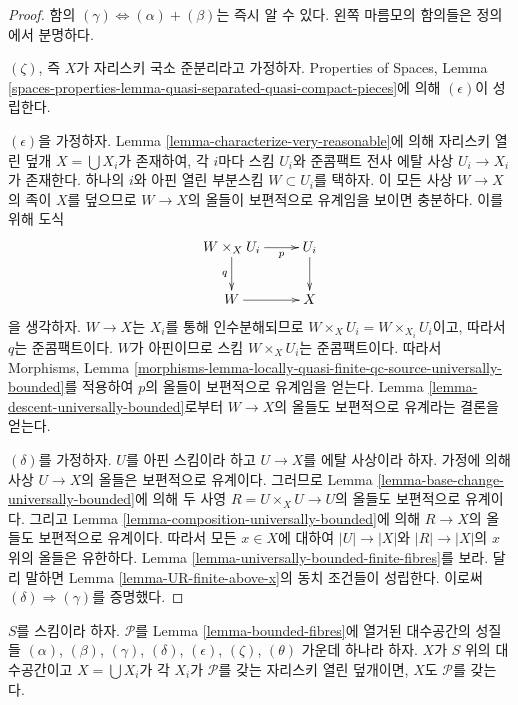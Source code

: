 \begin{proof}
함의 $(\gamma) \Leftrightarrow (\alpha) + (\beta)$는 즉시 알 수 있다.
왼쪽 마름모의 함의들은 정의에서 분명하다.

\medskip\noindent
$(\zeta)$, 즉 $X$가 자리스키 국소 준분리라고 가정하자.
Properties of Spaces, Lemma
\ref{spaces-properties-lemma-quasi-separated-quasi-compact-pieces}에 의해
$(\epsilon)$이 성립한다.

\medskip\noindent
$(\epsilon)$을 가정하자. Lemma
\ref{lemma-characterize-very-reasonable}에 의해 자리스키 열린 덮개
$X = \bigcup X_i$가 존재하여, 각 $i$마다 스킴 $U_i$와 준콤팩트 전사
에탈 사상 $U_i \to X_i$가 존재한다. 하나의 $i$와 아핀 열린 부분스킴
$W \subset U_i$를 택하자. 이 모든 사상 $W \to X$의 족이 $X$를
덮으므로 $W \to X$의 올들이 보편적으로 유계임을 보이면 충분하다.
이를 위해 도식
$$
\xymatrix{
W \times_X U_i \ar[r]_-p \ar[d]_q & U_i \ar[d] \\
W \ar[r] & X
}
$$
을 생각하자. $W \to X$는 $X_i$를 통해 인수분해되므로
$W \times_X U_i = W \times_{X_i} U_i$이고, 따라서 $q$는 준콤팩트이다.
$W$가 아핀이므로 스킴 $W \times_X U_i$는 준콤팩트이다.
따라서 Morphisms, Lemma
\ref{morphisms-lemma-locally-quasi-finite-qc-source-universally-bounded}를
적용하여 $p$의 올들이 보편적으로 유계임을 얻는다.
Lemma \ref{lemma-descent-universally-bounded}로부터
$W \to X$의 올들도 보편적으로 유계라는 결론을 얻는다.

\medskip\noindent
$(\delta)$를 가정하자. $U$를 아핀 스킴이라 하고 $U \to X$를 에탈
사상이라 하자. 가정에 의해 사상 $U \to X$의 올들은 보편적으로
유계이다. 그러므로 Lemma
\ref{lemma-base-change-universally-bounded}에 의해 두 사영
$R = U \times_X U \to U$의 올들도 보편적으로 유계이다.
그리고 Lemma \ref{lemma-composition-universally-bounded}에 의해
$R \to X$의 올들도 보편적으로 유계이다.
따라서 모든 $x \in X$에 대하여 $|U| \to |X|$와 $|R| \to |X|$의
$x$ 위의 올들은 유한하다. Lemma
\ref{lemma-universally-bounded-finite-fibres}를 보라.
달리 말하면 Lemma \ref{lemma-UR-finite-above-x}의 동치 조건들이
성립한다. 이로써 $(\delta) \Rightarrow (\gamma)$를 증명했다.
\end{proof}

\begin{lemma}
\label{lemma-properties-local}
$S$를 스킴이라 하자. $\mathcal{P}$를 Lemma
\ref{lemma-bounded-fibres}에 열거된 대수공간의 성질들
$(\alpha)$, $(\beta)$, $(\gamma)$, $(\delta)$, $(\epsilon)$, $(\zeta)$,
$(\theta)$ 가운데 하나라 하자. $X$가 $S$ 위의 대수공간이고
$X = \bigcup X_i$가 각 $X_i$가 $\mathcal{P}$를 갖는 자리스키 열린
덮개이면, $X$도 $\mathcal{P}$를 갖는다.
\end{lemma}

